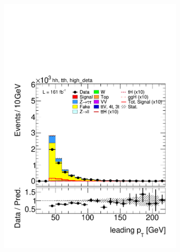     \begin{figure}[htbp]
      \centering
      \begin{subfigure}[b]{0.45\textwidth}
        \centering
        \includegraphics[width=\textwidth]{images/highdeta_highdeta_run3/plot_tau_0_pt_hh_tth_22_23_24_high_deta.pdf}
        \caption{}
      \end{subfigure}
      \hfill
      \begin{subfigure}[b]{0.45\textwidth}
        \centering

\end{subfigure}
\end{figure}
